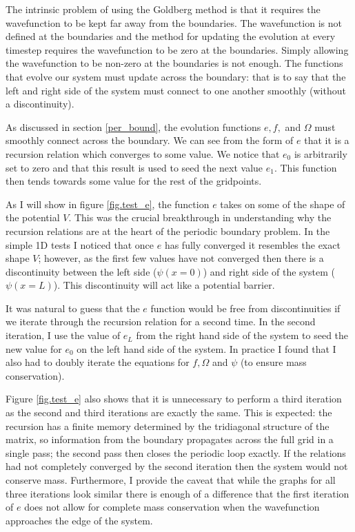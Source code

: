 The intrinsic problem of using the Goldberg method is that it requires the wavefunction to be kept far away from the boundaries. The wavefunction is not defined at the boundaries and the method for updating the evolution at every timestep requires the wavefunction to be zero at the boundaries. Simply allowing the wavefunction to be non-zero at the boundaries is not enough. The functions that evolve our system must update across the boundary: that is to say that the left and right side of the system must connect to one another smoothly (without a discontinuity). 

As discussed in section \ref{per_bound}, the evolution functions $e,f,$ and $\Omega$ must smoothly connect across the boundary. We can see from the form of $e$ that it is a recursion relation which converges to some value. We notice that $e_0$ is arbitrarily set to zero and that this result is used to seed the next value $e_1$. This function then tends towards some value for the rest of the gridpoints.

As I will show in figure \ref{fig.test_e}, the function $e$ takes on some of the shape of the potential $V$. This was the crucial breakthrough in understanding why the recursion relations are at the heart of the periodic boundary problem. In the simple 1D tests I noticed that once $e$ has fully converged it resembles the exact shape $V$; however, as the first few values have not converged then there is a discontinuity between the left side ($\psi(x=0)$) and right side of the system ($\psi(x=L)$). This discontinuity will act like a potential barrier.

It was natural to guess that the $e$ function would be free from discontinuities if we iterate through the recursion relation for a second time. In the second iteration, I use the value of $e_L$ from the right hand side of the system to seed the new value for $e_0$ on the left hand side of the system. In practice I found that I also had to doubly iterate the equations for $f, \Omega$ and $\psi$ (to ensure mass conservation).

Figure \ref{fig.test_e} also shows that it is unnecessary to perform a third iteration as the second and third iterations are exactly the same. This is expected: the recursion has a finite memory determined by the tridiagonal structure of the matrix, so information from the boundary propagates across the full grid in a single pass; the second pass then closes the periodic loop exactly. If the relations had not completely converged by the second iteration then the system would not conserve mass. Furthermore, I provide the caveat that while the graphs for all three iterations look similar there is enough of a difference that the first iteration of $e$ does not allow for complete mass conservation when the wavefunction approaches the edge of the system.

